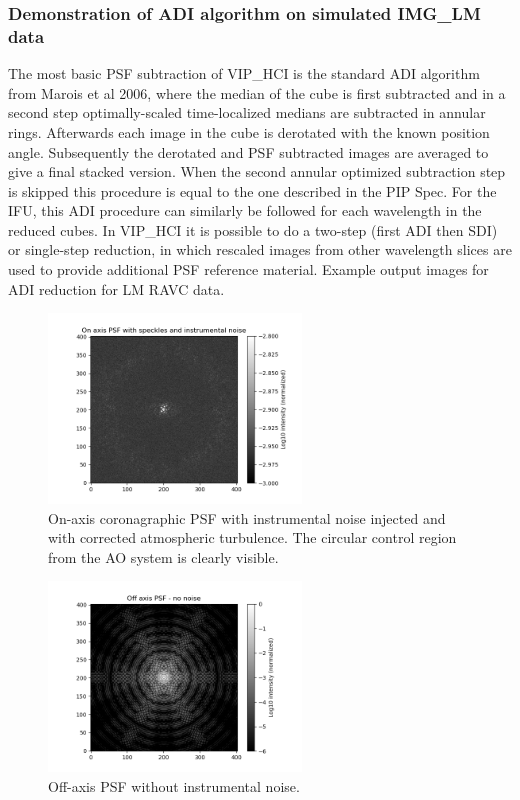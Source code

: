 \subsubsection{Demonstration of ADI algorithm on simulated IMG\_LM data}
The most basic PSF subtraction of VIP\_HCI is the standard ADI algorithm from Marois et al 2006, where the median of the cube is first subtracted and in a second step optimally-scaled time-localized medians are subtracted in annular rings. Afterwards each image in the cube is derotated with the known position angle. Subsequently the derotated and PSF subtracted images are averaged to give a final stacked version. When the second annular optimized subtraction step is skipped this procedure is equal to the one described in the PIP Spec.
For the IFU, this ADI procedure can similarly be followed for each wavelength in the reduced cubes. In VIP\_HCI it is possible to do a two-step (first ADI then SDI) or single-step reduction, in which rescaled images from other wavelength slices are used to provide additional PSF reference material.
Example output images for ADI reduction for LM RAVC data.


\begin{figure}[!ht]
  \centering
  \includegraphics[width=0.6\textwidth]{./figures/onaxis_psf.png}
  \caption{On-axis coronagraphic PSF with instrumental noise injected and with corrected atmospheric turbulence. The circular control region from the AO system is clearly visible.}
\end{figure}
\begin{figure}[!ht]
  \centering
  \includegraphics[width=0.6\textwidth]{./figures/offaxis_psf.png}
  \caption{Off-axis PSF without instrumental noise.}
\end{figure}

